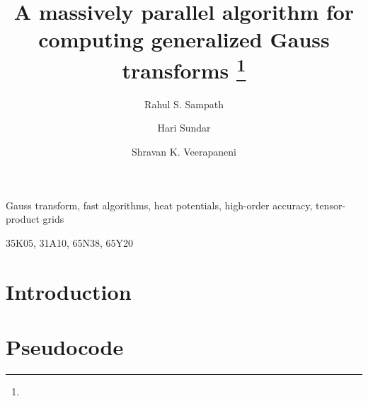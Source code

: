 \documentclass[final]{siamltex}
\begin{document}
\title{A massively parallel algorithm for computing generalized Gauss transforms \thanks{}}
\author{Rahul S. Sampath\and Hari Sundar\and Shravan K. Veerapaneni}
\maketitle

\begin{abstract}

\end{abstract}
%
\begin{keywords} 
Gauss transform, fast algorithms, heat potentials, high-order
accuracy, tensor-product grids
\end{keywords}
%
\begin{AMS}
35K05, 31A10, 65N38, 65Y20
\end{AMS}
%

\section{Introduction} \label{sc:intro}


\section{Pseudocode} \label{sc:pseudocode}


%

%

%

\newpage

%	



\end{document}
